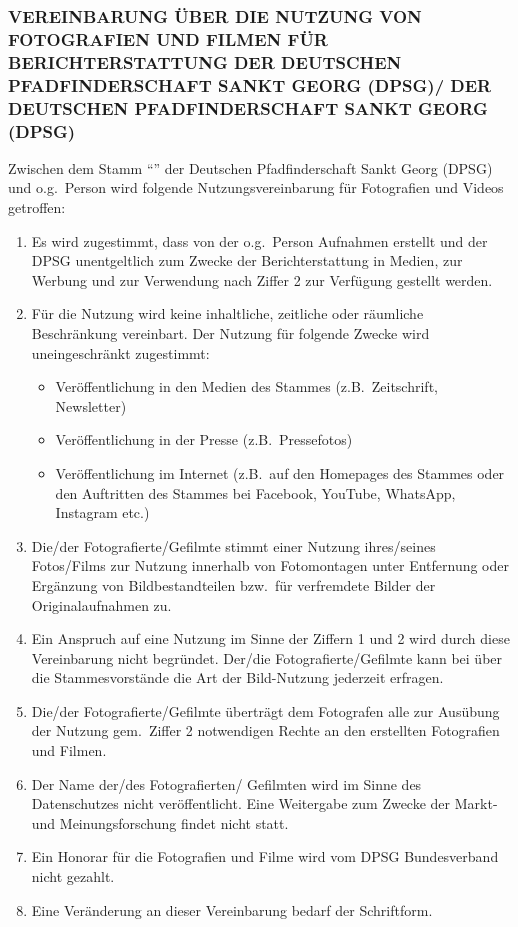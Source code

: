 
\subsubsection*{VEREINBARUNG ÜBER DIE NUTZUNG VON FOTOGRAFIEN UND FILMEN FÜR BERICHTERSTATTUNG DER 
	DEUTSCHEN PFADFINDERSCHAFT SANKT GEORG (DPSG)/\MakeUppercase{\orgName} DER DEUTSCHEN
	PFADFINDERSCHAFT SANKT GEORG (DPSG)}
Zwischen dem Stamm \enquote{\orgName} der Deutschen Pfadfinderschaft Sankt Georg (DPSG) und o.g.\ Person wird folgende Nutzungsvereinbarung für Fotografien und
Videos getroffen:

\begin{enumerate}
	\item Es wird zugestimmt, dass von der o.g.\ Person Aufnahmen erstellt und der DPSG unentgeltlich zum
	Zwecke der Berichterstattung in Medien, zur Werbung und zur Verwendung nach Ziffer 2 zur 
	Verfügung gestellt werden.
	\item Für die Nutzung wird keine inhaltliche, zeitliche oder räumliche Beschränkung vereinbart.
	Der Nutzung für folgende Zwecke wird uneingeschränkt zugestimmt:
	\begin{itemize}[noitemsep]
		\item Veröffentlichung in den Medien des Stammes (z.B.\ Zeitschrift, Newsletter)
		\item Veröffentlichung in der Presse (z.B.\ Pressefotos)
		\item Veröffentlichung im Internet (z.B.\ auf den Homepages des Stammes oder den Auftritten des
		Stammes bei Facebook, YouTube, WhatsApp, Instagram etc.)
	\end{itemize}
	\item Die/der Fotografierte/Gefilmte stimmt einer Nutzung ihres/seines Fotos/Films zur Nutzung innerhalb 
	von Fotomontagen unter Entfernung oder Ergänzung von Bildbestandteilen bzw.\ für verfremdete
	Bilder der Originalaufnahmen zu.
	\item Ein Anspruch auf eine Nutzung im Sinne der Ziffern 1 und 2 wird durch diese Vereinbarung nicht 
	begründet.
	Der/die Fotografierte/Gefilmte kann bei \orgName über die
	Stammesvorstände die Art der Bild-Nutzung jederzeit erfragen.
	\item Die/der Fotografierte/Gefilmte überträgt dem Fotografen alle zur Ausübung der Nutzung gem.\ Ziffer 2
	notwendigen Rechte an den erstellten Fotografien und Filmen.
	\item Der Name der/des Fotografierten/ Gefilmten wird im Sinne des Datenschutzes nicht veröffentlicht. 
	Eine Weitergabe zum Zwecke der Markt- und Meinungsforschung findet nicht statt.
	\item Ein Honorar für die Fotografien und Filme wird vom DPSG Bundesverband nicht gezahlt.
	\item Eine Veränderung an dieser Vereinbarung bedarf der Schriftform.
\end{enumerate}
